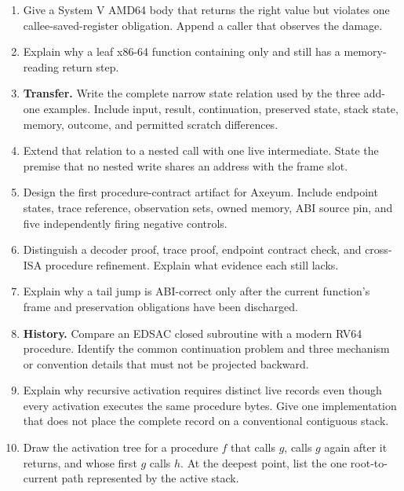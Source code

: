 \begin{enumerate}
\item Give a System V AMD64 body that returns the right value but violates one
callee-saved-register obligation. Append a caller that observes the damage.

\item Explain why a leaf x86-64 function containing only  and
 still has a memory-reading return step.

\item \textbf{Transfer.} Write the complete narrow state relation used by the
three add-one examples. Include input, result, continuation, preserved state,
stack state, memory, outcome, and permitted scratch differences.

\item Extend that relation to a nested call with one live intermediate. State
the premise that no nested write shares an address with the frame slot.

\item Design the first procedure-contract artifact for Axeyum. Include
endpoint states, trace reference, observation sets, owned memory, ABI source
pin, and five independently firing negative controls.

\item Distinguish a decoder proof, trace proof, endpoint contract check, and
cross-ISA procedure refinement. Explain what evidence each still lacks.

\item Explain why a tail jump is ABI-correct only after the current function's
frame and preservation obligations have been discharged.

\item \textbf{History.} Compare an EDSAC closed subroutine with a modern
RV64 procedure. Identify the common continuation problem and three mechanism
or convention details that must not be projected backward.

\item Explain why recursive activation requires distinct live records even
though every activation executes the same procedure bytes. Give one
implementation that does not place the complete record on a conventional
contiguous stack.

\item Draw the activation tree for a procedure \(f\) that calls \(g\), calls
\(g\) again after it returns, and whose first \(g\) calls \(h\). At the deepest
point, list the one root-to-current path represented by the active stack.


\end{enumerate}
